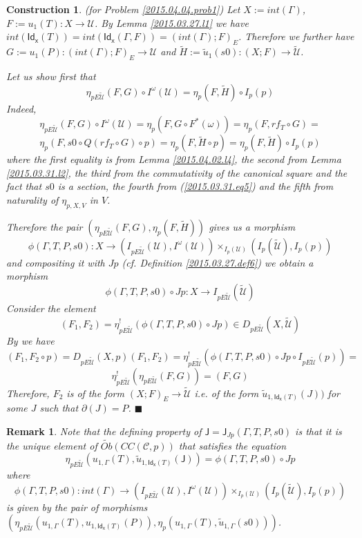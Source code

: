 \documentclass[12pt]{article}
\numberwithin{equation}{section}
\newtheorem{remark}[proposition]{Remark}
\newtheorem{construction0}[proposition]{Construction}
\newenvironment{construction}[1]{\begin{construction0}(for Problem \ref{#1})}{$\blacksquare$ \end{construction0}}
\newcommand{\llabel}[1]{\label{#1}}
\newcommand{\sr}{\rightarrow}
\newcommand{\wt}{\widetilde}
\newcommand{\toCC}{CC} %
\newcommand{\J}{\mathsf{J}}
\newcommand{\Idx}{\mathsf{Id_x}} %
\newcommand{\U}{\mathcal{U}}
\begin{document}
\begin{construction}{2015.04.04.prob1}\rm
\llabel{2015.04.04.constr1} Let $X:=int(\Gamma)$, $F:=u_1(T):X\sr \U$. By Lemma
\ref{2015.03.27.l1} we have
$int(\Idx(T))=int(\Idx(\Gamma,F))=(int(\Gamma);F)_{E}$. Therefore we further
have $G:=u_1(P):(int(\Gamma);F)_{E}\sr \U$ and $\wt{H}:=\wt{u}_1(s0):(X;F)\sr
\wt{\U}$.

Let us show first that
%
$$\eta_{pE\wt{\U}}(F,G)\circ I^{\omega}(\U)=\eta_p(F,\wt{H})\circ I_p(p)$$
%
Indeed,
%
$$\eta_{pE\wt{\U}}(F,G)\circ I^{\omega}(\U)=\eta_p(F,G\circ
F^*(\omega))=\eta_p(F,rf_T\circ G)=$$
$$\eta_p(F,s0\circ Q(rf_T\circ G)\circ p)=\eta_p(F,\wt{H}\circ
p)=\eta_p(F,\wt{H})\circ I_p(p)$$
%
where the first equality is from Lemma \ref{2015.04.02.l4}, the second from
Lemma \ref{2015.03.31.l2}, the third from the commutativity of the canonical
square and the fact that $s0$ is a section, the fourth from
(\ref{2015.03.31.eq5}) and the fifth from naturality of $\eta_{p,X,V}$ in $V$.

Therefore the pair $(\eta_{pE\wt{\U}}(F,G),\eta_p(F,\wt{H}))$ gives us a
morphism
%
$$\phi(\Gamma,T,P,s0):X\sr (I_{pE\wt{\U}}(\U), I^{\omega}(\U)) \times_{I_p(\U)}
(I_p(\wt{\U}),I_p(p))$$
%
and compositing it with $Jp$ (cf. Definition \ref{2015.03.27.def6}) we obtain a
morphism
%
$$\phi(\Gamma,T,P,s0)\circ Jp: X\sr I_{pE\wt{\U}}(\wt{\U})$$
%
Consider the element
%
$$(F_1,F_2)=\eta^!_{pE\wt{\U}}(\phi(\Gamma,T,P,s0)\circ Jp)\in
D_{pE\wt{\U}}(X,\wt{\U})$$
%
By \cite[Problem 3.8(1)]{fromunivwithPi} we have
%
$$(F_1,F_2\circ
p)=D_{pE\wt{\U}}(X,p)(F_1,F_2)=\eta^!_{pE\wt{\U}}(\phi(\Gamma,T,P,s0)\circ
Jp\circ I_{pE\wt{\U}}(p))=$$
%
$$\eta^!_{pE\wt{\U}}(\eta_{pE\wt{\U}}(F,G))=(F,G)$$
%
Therefore, $F_2$ is of the form $(X;F)_E\sr \wt{\U}$ i.e. of the form
$\wt{u}_{1,\Idx(T)}(J))$ for some $J$ such that $\partial(J)=P$.
\end{construction}
%
\begin{remark}\rm
\llabel{2015.05.08.rem1} Note that the defining property of
$\J=\J_{Jp}(\Gamma,T,P,s0)$ is that it is the unique element of
$\wt{Ob}(\toCC({\mathcal C},p))$ that satisfies the equation
%
$$\eta_{pE\wt{\U}}(u_{1,\Gamma}(T),\wt{u}_{1,\Idx(T)}(\J))=\phi(\Gamma,T,P,s0)\circ
Jp$$
%
where
%
$$\phi(\Gamma,T,P,s0):int(\Gamma)\sr
(I_{pE\wt{\U}}(\U),I^{\omega}(\U))\times_{I_p(\U)}(I_p(\wt{\U}),I_p(p))$$
%
is given by the pair of morphisms $(\eta_{pE\wt{\U}}(u_{1,\Gamma}(T),
u_{1,\Idx(T)}(P)), \eta_p(u_{1,\Gamma}(T),\wt{u}_{1,\Gamma}(s0)))$.
\end{remark}
%
\end{document}
